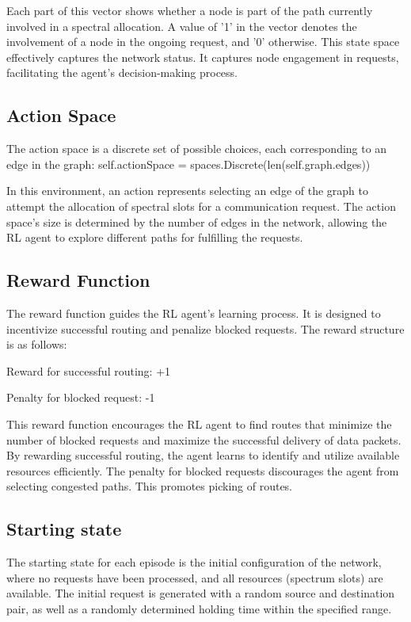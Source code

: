 \documentclass[conference]{IEEEtran}
\begin{document}
Each part of this vector shows whether a node is part of the path currently involved in a spectral allocation. A value of '1' in the vector denotes the involvement of a node in the ongoing request, and '0' otherwise. This state space effectively captures the network status. It captures node engagement in requests, facilitating the agent's decision-making process.

\subsection{Action Space}
The action space is a discrete set of possible choices, each corresponding to an edge in the graph: self.actionSpace = spaces.Discrete(len(self.graph.edges))

In this environment, an action represents selecting an edge of the graph to attempt the allocation of spectral slots for a communication request. The action space's size is determined by the number of edges in the network, allowing the RL agent to explore different paths for fulfilling the requests.

\subsection{Reward Function}
The reward function guides the RL agent's learning process.  It is designed to incentivize successful routing and penalize blocked requests. The reward structure is as follows:

Reward for successful routing: +1

Penalty for blocked request: -1

This reward function encourages the RL agent to find routes that minimize the number of blocked requests and maximize the successful delivery of data packets. By rewarding successful routing, the agent learns to identify and utilize available resources efficiently. The penalty for blocked requests discourages the agent from selecting congested paths. This promotes picking of routes.

\subsection{Starting state}
The starting state for each episode is the initial configuration of the network, where no requests have been processed, and all resources (spectrum slots) are available. The initial request is generated with a random source and destination pair, as well as a randomly determined holding time within the specified range.
\end{document}

